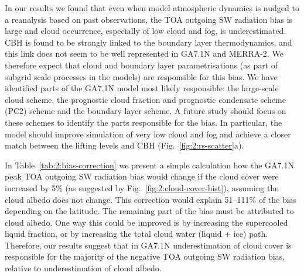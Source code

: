 In our results we found that even when model atmospheric dynamics is
nudged to a reanalysis
based on past observations, the TOA outgoing SW radiation bias is large and
cloud occurrence, especially of low cloud and fog, is underestimated. CBH is
found to be strongly linked to the boundary layer thermodynamics, and this link
does not seem to be well represented in GA7.1N and MERRA-2. We therefore expect
that cloud and boundary layer parametrisations (as part of subgrid scale
processes in the models) are responsible for this bias. We have identified
parts of the GA7.1N model most likely responsible: the large-scale cloud scheme,
the prognostic cloud fraction and prognostic condensate scheme (PC2) scheme \citep{wilson2008a,wilson2008b} and the boundary layer scheme. A
future study should focus on these schemes to identify the parts responsible
for the bias. In particular, the model should improve simulation of very low
cloud and fog and achieve a closer match between the lifting levels and CBH
(Fig.~\ref{fig:2:rs-scatter}a).

\begin{table}[t]
\caption[A table showing a "back-of-the-envelope" calculation]{
A table showing a "back-of-the-envelope" calculation how the GA7.1N peak TOA
outgoing SW radiation bias (Fig.~\ref{fig:2:sw_up_toa_time}) would change if
the cloud cover were increased by 5\% (Fig.~\ref{fig:2:cloud-cover-hist}),
asssuming the cloud albedo does not change. The "corrected" TOA outgoing SW
radiation is calculated by multiplying the original value by 1.05.
}
\label{tab:2:bias-correction}
\centering
\centerline{}
\end{table}

In Table~\ref{tab:2:bias-correction} we present a simple calculation how the
GA7.1N peak TOA outgoing SW radiation bias would change if the cloud cover were
increased by 5\% (as suggested by Fig.~\ref{fig:2:cloud-cover-hist}), assuming
the cloud albedo does not change. This correction would explain 51--111\% of
the bias depending on the latitude. The remaining part of the bias must be
attributed to cloud albedo. One way this could be improved is by increasing the
supercooled liquid fraction, or by increasing the total cloud water (liquid +
ice) path. Therefore, our results suggest that in GA7.1N underestimation of
cloud cover is responsible for the majority of the negative TOA outgoing SW
radiation bias, relative to underestimation of cloud albedo.

